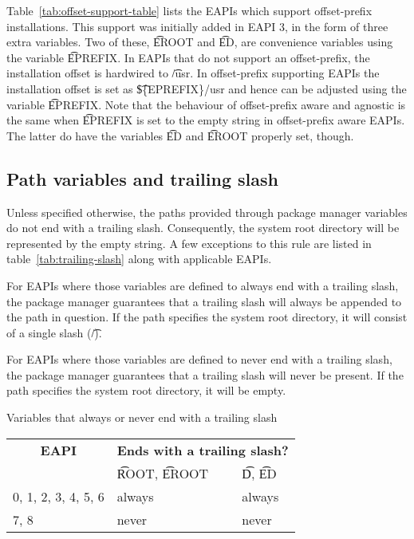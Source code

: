  Table~\ref{tab:offset-support-table} lists the EAPIs which
support offset-prefix installations. This support was initially added in EAPI 3, in the form of
three extra variables. Two of these, \t{EROOT} and \t{ED}, are convenience variables using the
variable \t{EPREFIX}\@. In EAPIs that do not support an offset-prefix, the installation offset is
hardwired to \t{/usr}. In offset-prefix supporting EAPIs the installation offset is set as
\t{\$\{EPREFIX\}/usr} and hence can be adjusted using the variable \t{EPREFIX}\@. Note that the
behaviour of offset-prefix aware and agnostic is the same when \t{EPREFIX} is set to the empty
string in offset-prefix aware EAPIs. The latter do have the variables \t{ED} and \t{EROOT} properly
set, though.

\subsection{Path variables and trailing slash}
\label{sec:trailing-slash}

Unless specified otherwise, the paths provided through package manager variables do not end with
a trailing slash. Consequently, the system root directory will be represented by the empty string.
A few exceptions to this rule are listed in table~\ref{tab:trailing-slash} along with applicable
EAPIs.

For EAPIs where those variables are defined to always end with a trailing slash, the package manager
guarantees that a trailing slash will always be appended to the path in question. If the path
specifies the system root directory, it will consist of a single slash (\t{/}).

 For EAPIs where those variables are defined to never end with
a trailing slash, the package manager guarantees that a trailing slash will never be present.
If the path specifies the system root directory, it will be empty.

\begin{centertable}{Variables that always or never end with a trailing slash}
    \label{tab:trailing-slash}
    \begin{tabular}{lll}
      \toprule
      \multicolumn{1}{c}{\textbf{EAPI}} &
      \multicolumn{2}{c}{\textbf{Ends with a trailing slash?}} \\
      &
      \t{ROOT}, \t{EROOT} &
      \t{D}, \t{ED} \\
      \midrule
      0, 1, 2, 3, 4, 5, 6 & always & always \\
      7, 8                & never  & never  \\
      \bottomrule
    \end{tabular}
\end{centertable}


